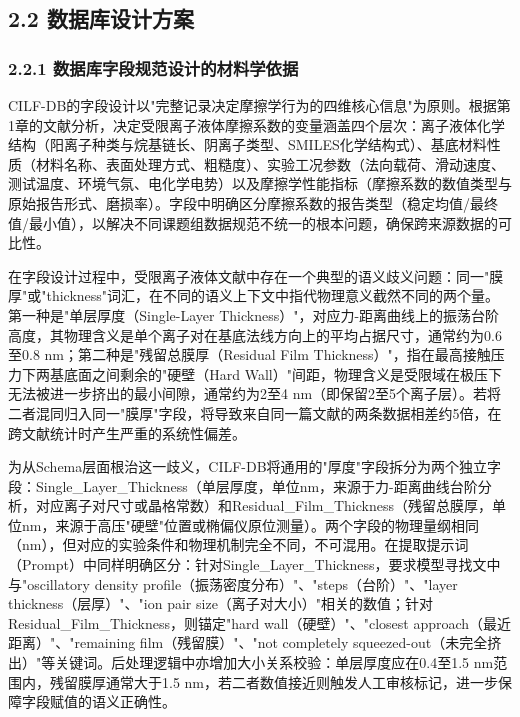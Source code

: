 \hypertarget{ux6570ux636eux5e93ux8bbeux8ba1ux65b9ux6848}{%
\subsection{2.2 数据库设计方案}\label{ux6570ux636eux5e93ux8bbeux8ba1ux65b9ux6848}}

\hypertarget{ux6570ux636eux5e93ux5b57ux6bb5ux89c4ux8303ux8bbeux8ba1ux7684ux6750ux6599ux5b66ux4f9dux636e}{%
\subsubsection{2.2.1 数据库字段规范设计的材料学依据}\label{ux6570ux636eux5e93ux5b57ux6bb5ux89c4ux8303ux8bbeux8ba1ux7684ux6750ux6599ux5b66ux4f9dux636e}}

CILF-DB的字段设计以"完整记录决定摩擦学行为的四维核心信息"为原则。根据第1章的文献分析，决定受限离子液体摩擦系数的变量涵盖四个层次：离子液体化学结构（阳离子种类与烷基链长、阴离子类型、SMILES化学结构式）、基底材料性质（材料名称、表面处理方式、粗糙度）、实验工况参数（法向载荷、滑动速度、测试温度、环境气氛、电化学电势）以及摩擦学性能指标（摩擦系数的数值类型与原始报告形式、磨损率）。字段中明确区分摩擦系数的报告类型（稳定均值/最终值/最小值），以解决不同课题组数据规范不统一的根本问题，确保跨来源数据的可比性。

在字段设计过程中，受限离子液体文献中存在一个典型的语义歧义问题：同一"膜厚"或"thickness"词汇，在不同的语义上下文中指代物理意义截然不同的两个量。第一种是"单层厚度（Single-Layer Thickness）"，对应力-距离曲线上的振荡台阶高度，其物理含义是单个离子对在基底法线方向上的平均占据尺寸，通常约为0.6至0.8 nm；第二种是"残留总膜厚（Residual Film Thickness）"，指在最高接触压力下两基底面之间剩余的"硬壁（Hard Wall）"间距，物理含义是受限域在极压下无法被进一步挤出的最小间隙，通常约为2至4 nm（即保留2至5个离子层）。若将二者混同归入同一"膜厚"字段，将导致来自同一篇文献的两条数据相差约5倍，在跨文献统计时产生严重的系统性偏差。

为从Schema层面根治这一歧义，CILF-DB将通用的"厚度"字段拆分为两个独立字段：Single\_Layer\_Thickness（单层厚度，单位nm，来源于力-距离曲线台阶分析，对应离子对尺寸或晶格常数）和Residual\_Film\_Thickness（残留总膜厚，单位nm，来源于高压"硬壁"位置或椭偏仪原位测量）。两个字段的物理量纲相同（nm），但对应的实验条件和物理机制完全不同，不可混用。在提取提示词（Prompt）中同样明确区分：针对Single\_Layer\_Thickness，要求模型寻找文中与"oscillatory density profile（振荡密度分布）"、"steps（台阶）"、"layer thickness（层厚）"、"ion pair size（离子对大小）"相关的数值；针对Residual\_Film\_Thickness，则锚定"hard wall（硬壁）"、"closest approach（最近距离）"、"remaining film（残留膜）"、"not completely squeezed-out（未完全挤出）"等关键词。后处理逻辑中亦增加大小关系校验：单层厚度应在0.4至1.5 nm范围内，残留膜厚通常大于1.5 nm，若二者数值接近则触发人工审核标记，进一步保障字段赋值的语义正确性\cite{ref25,ref17}。

